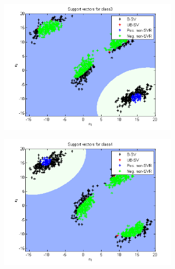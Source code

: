 \documentclass{article}
\begin{document}
\begin{figure}
\begin{subfigure}{.5\textwidth}
  \centering
  \includegraphics[width=.8\linewidth]{Classification/1a/nu_g/sv3}
 
\end{subfigure}%
\begin{subfigure}{.5\textwidth}
  \centering
  \includegraphics[width=.8\linewidth]{Classification/1a/nu_g/sv4}
  
\end{subfigure}
\end{figure}
\end{document}
